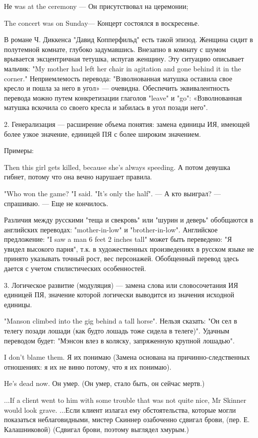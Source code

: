 Не was at the ceremony --- Он присутствовал на церемонии;

The concert was on Sunday--- Концерт состоялся в воскресенье.

В романе Ч. Диккенса "Давид Копперфильд" есть такой эпизод. Женщина сидит в полутемной комнате, глубоко задумавшись. Внезапно в комнату с шумом врывается эксцентричная тетушка, испугав женщину. Эту ситуацию описывает мальчик: "My mother had left her chair in agitation and gone behind it in the corner." Неприемлемость перевода: "Взволнованная матушка оставила свое кресло и пошла за него в угол» --- очевидна. Обеспечить эквивалентность перевода можно путем конкретизации глаголов "leave" и "go": «Взволнованная матушка вскочила со своего кресла и забилась в угол позади него".

2. Генерализация --- расширение объема понятия: замена единицы ИЯ, имеющей более узкое значение, единицей ПЯ с более широким значением.

Примеры:

Then this girl gets killed, because she's always speeding. А потом девушка гибнет, потому что она вечно нарушает правила.

"Who won the game? "I said. "It's only the half". --- А кто выиграл? --- спрашиваю. --- Еще не кончилось.

Различия между русскими "теща и свекровь" или "шурин и деверь" обобщаются в английских переводах: "mother-in-low" и "brother-in-low". Английское предложение: "I saw a man 6 feet 2 inches tall" может быть переведено: "Я увидел высокого парня", т.к. в художественных произведениях в русском языке не принято указывать точный рост, вес персонажей. Обобщенный перевод здесь дается с учетом стилистических особенностей.

3. Логическое развитие (модуляция) --- замена слова или словосочетания ИЯ единицей ПЯ, значение которой логически выводится из значения исходной единицы.

"Manson climbed into the gig behind a tall horse". Нельзя сказать: "Он сел в телегу позади лошади (как будто лошадь тоже сидела в телеге)". Удачным переводом будет: "Мэнсон влез в коляску, запряженную крупной лошадью".

I don't blame them. Я их понимаю (Замена основана на причинно-следственных отношениях: я их не виню потому, что я их понимаю).

He's dead now.  Он умер. (Он умер, стало быть, он сейчас мертв.)

...If a client went to him with some trouble that was not quite nice, Mr Skinner would look grave. ...Если клиент излагал ему обстоятельства, которые могли показаться неблаговидными, мистер Скиннер озабоченно сдвигал брови, (пер. Е. Калашниковой) (Сдвигал брови, поэтому выглядел хмурым.)

